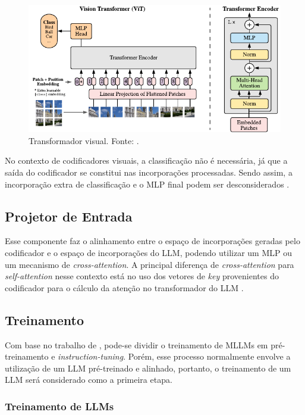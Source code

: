 \begin{figure}[ht]
      \centering
      \includegraphics[width=0.8\columnwidth,keepaspectratio]{images/vision_transformer.pdf}
      \caption{\small Transformador visual. Fonte: \textcite{dosovitskiy2020image}.}
      \label{fig:vision_transformer}
\end{figure}

No contexto de codificadores visuais, a classificação não é necessária, já que a saída do codificador se constitui nas incorporações processadas. Sendo assim, a
incorporação extra de classificação e o \ac{MLP} final podem ser desconsiderados \cite{dubey2024llama}.

\subsection{Projetor de Entrada}

Esse componente faz o alinhamento entre o espaço de incorporações geradas pelo codificador e o espaço de incorporações do \ac{LLM}, podendo utilizar um \ac{MLP} ou um
mecanismo de \textit{cross-attention}. A principal diferença de \textit{cross-attention} para \textit{self-attention} nesse contexto está no uso dos vetores de
\textit{key} provenientes do codificador para o cálculo da atenção no transformador do \ac{LLM} \cite{mllm_survey_2024}.

\subsection{Treinamento}

Com base no trabalho de \textcite{mllm_survey_2024}, pode-se dividir o treinamento de \acp{MLLM} em pré-treinamento e \textit{instruction-tuning}. Porém, esse processo
normalmente envolve a utilização de um \ac{LLM} pré-treinado e alinhado, portanto, o treinamento de um \ac{LLM} será considerado como a primeira etapa.

\subsubsection{Treinamento de LLMs}


